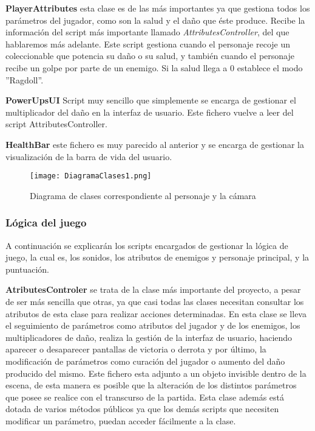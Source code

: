 \textbf{PlayerAttributes} esta clase es de las más importantes ya que gestiona todos los parámetros del jugador, como son la salud y el daño que éste produce. Recibe la información del script más importante llamado \textit{AttributesController}, del que hablaremos más adelante. Este script gestiona cuando el personaje recoje un coleccionable que potencia su daño o su salud, y también cuando el personaje recibe un golpe por parte de un enemigo. Si la salud llega a 0 establece el modo ''Ragdoll''.

\textbf{PowerUpsUI} Script muy sencillo que simplemente se encarga de gestionar el multiplicador del daño en la interfaz de usuario. Este fichero vuelve a leer del script AttributesController.

\textbf{HealthBar} este fichero es muy parecido al anterior y se encarga de gestionar la visualización de la barra de vida del usuario. 

\begin{figure}[H]
    \centering
    \texttt{[image: DiagramaClases1.png]}
    \caption{Diagrama de clases correspondiente al personaje y la cámara}
\end{figure}

\subsubsection{Lógica del juego}

A continuación se explicarán los scripts encargados de gestionar la lógica de juego, la cual es, los sonidos, los atributos de enemigos y personaje principal, y la puntuación.

\textbf{AtributesControler} se trata de la clase más importante del proyecto, a pesar de ser más sencilla que otras, ya que casi todas las clases necesitan consultar los atributos de esta clase para realizar acciones determinadas. En esta clase se lleva el seguimiento de parámetros como atributos del jugador y de los enemigos, los multiplicadores de daño, realiza la gestión de la interfaz de usuario, haciendo aparecer o desaparecer pantallas de victoria o derrota y por último, la modificación de parámetros como curación del jugador o aumento del daño producido del mismo. Este fichero esta adjunto a un objeto invisible dentro de la escena, de esta manera es posible que la alteración de los distintos parámetros que posee se realice con el transcurso de la partida. Esta clase además está dotada de varios métodos públicos ya que los demás scripts que necesiten modificar un parámetro, puedan acceder fácilmente a la clase.


